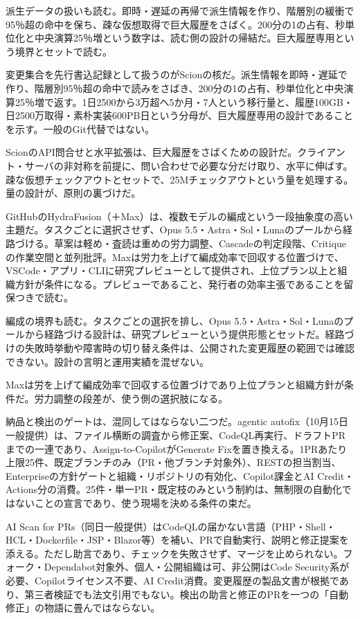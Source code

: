 \documentclass[lualatex,a4paper,10pt]{jlreq}
\begin{document}
派生データの扱いも読む。即時・遅延の再帰で派生情報を作り、階層別の緩衝で95％超の命中を保ち、疎な仮想取得で巨大履歴をさばく。200分の1の占有、秒単位化と中央演算25％増という数字は、読む側の設計の帰結だ。巨大履歴専用という境界とセットで読む。
\cite{B32,B75}


変更集合を先行書込記録として扱うのがScionの核だ。派生情報を即時・遅延で作り、階層別95％超の命中で読みをさばき、200分の1の占有、秒単位化と中央演算25％増で返す。1日2500から3万超へ5か月・7人という移行量と、履歴100GB・日2500万取得・素朴実装600PB日という分母が、巨大履歴専用の設計であることを示す。一般のGit代替ではない。
\cite{B32,B75}


ScionのAPI問合せと水平拡張は、巨大履歴をさばくための設計だ。クライアント・サーバの非対称を前提に、問い合わせで必要な分だけ取り、水平に伸ばす。疎な仮想チェックアウトとセットで、25Mチェックアウトという量を処理する。量の設計が、原則の裏づけだ。
\cite{B32,B75}


GitHubのHydraFusion（＋Max）は、複数モデルの編成という一段抽象度の高い主題だ。タスクごとに選択させず、Opus 5.5・Astra・Sol・Lunaのプールから経路づける。草案は軽め・査読は重めの労力調整、Cascadeの判定段階、Critiqueの作業空間と並列批評。Maxは労力を上げて編成効率で回収する位置づけで、VSCode・アプリ・CLIに研究プレビューとして提供され、上位プラン以上と組織方針が条件になる。プレビューであること、発行者の効率主張であることを留保つきで読む。
\cite{B33,B76}


編成の境界も読む。タスクごとの選択を排し、Opus 5.5・Astra・Sol・Lunaのプールから経路づける設計は、研究プレビューという提供形態とセットだ。経路づけの失敗時挙動や障害時の切り替え条件は、公開された変更履歴の範囲では確認できない。設計の言明と運用実績を混ぜない。
\cite{B33,B76}


Maxは労を上げて編成効率で回収する位置づけであり上位プランと組織方針が条件だ。労力調整の段差が、使う側の選択肢になる。
\cite{B33,B76}


納品と検出のゲートは、混同してはならない二つだ。agentic autofix（10月15日一般提供）は、ファイル横断の調査から修正案、CodeQL再実行、ドラフトPRまでの一連であり、Assign-to-CopilotがGenerate Fixを置き換える。1PRあたり上限25件、既定ブランチのみ（PR・他ブランチ対象外）、RESTの担当割当、Enterpriseの方針ゲートと組織・リポジトリの有効化、Copilot課金とAI Credit・Actions分の消費。25件・単一PR・既定枝のみという制約は、無制限の自動化ではないことの宣言であり、使う現場を決める条件の束だ。
\cite{B34,B77}


AI Scan for PRs（同日一般提供）はCodeQLの届かない言語（PHP・Shell・HCL・Dockerfile・JSP・Blazor等）を補い、PRで自動実行、説明と修正提案を添える。ただし助言であり、チェックを失敗させず、マージを止められない。フォーク・Dependabot対象外、個人・公開組織は可、非公開はCode Security系が必要、Copilotライセンス不要、AI Credit消費。変更履歴の製品文書が根拠であり、第三者検証でも法文引用でもない。検出の助言と修正のPRを一つの「自動修正」の物語に畳んではならない。
\cite{B35,B78}
\end{document}
